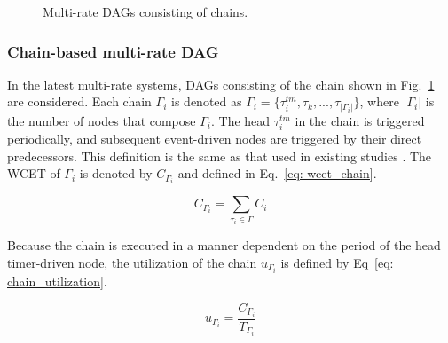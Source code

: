 \begin{figure}[tb]
    \centering
    \caption{Multi-rate DAGs consisting of chains.}
    \label{fig: chain_dag}
\end{figure}


\subsubsection{Chain-based multi-rate DAG}
\label{sssec: dag_chain}

In the latest multi-rate systems, DAGs consisting of the chain shown in Fig.~\ref{fig: chain_dag} are considered.
Each chain $\Gamma_i$ is denoted as $\Gamma_i = \{\tau^{tm}_i, \tau_k, ..., \tau_{|\Gamma_i|}\}$, where $|\Gamma_i|$ is the number of nodes that compose $\Gamma_i$.
The head $\tau^{tm}_i$ in the chain is triggered periodically, and subsequent event-driven nodes are triggered by their direct predecessors.
This definition is the same as that used in existing studies \cite{choi2020chain, tang2020response}.
The WCET of $\Gamma_i$ is denoted by $C_{\Gamma_i}$ and defined in Eq.~\ref{eq: wcet_chain}.

\begin{equation}
    \label{eq: wcet_chain}
    C_{\Gamma_i} = \sum_{\tau_i \in \Gamma}C_i
\end{equation}

Because the chain is executed in a manner dependent on the period of the head timer-driven node, the utilization of the chain $u_{\Gamma_i}$ is defined by Eq~\ref{eq: chain_utilization}.

\begin{equation}
    \label{eq: chain_utilization}
    u_{\Gamma_i} = \frac{C_{\Gamma_i}}{T_{\Gamma_i}}
\end{equation}

